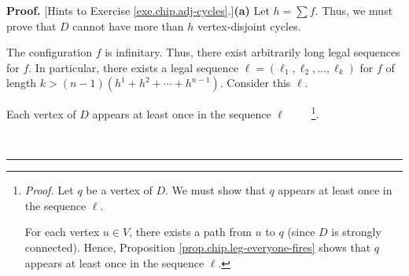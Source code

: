 \documentclass[numbers=enddot,12pt,final,onecolumn,notitlepage]{scrartcl}%
\theoremstyle{definition}
\newenvironment{proof}[1][Proof]{\noindent\textbf{#1.} }{\ \rule{0.5em}{0.5em}}
\let\sumnonlimits\sum
\renewcommand{\sum}{\sumnonlimits\limits}
\begin{document}
\begin{proof}
[Hints to Exercise \ref{exe.chip.adj-cycles}.]\textbf{(a)}
Let $h=\sum f$. Thus, we must prove that $D$ cannot have more than $h$
vertex-disjoint cycles.

The configuration
$f$ is infinitary. Thus, there exist arbitrarily long legal sequences for $f$.
In particular, there exists a legal sequence $\ell=\left(  \ell_{1},\ell
_{2},\ldots,\ell_{k}\right)  $ for $f$ of length $k>\left(  n-1\right)
\left( h^1 + h^2 + \cdots + h^{n-1} \right)  $. Consider this $\ell$.

Each vertex of $D$ appears at least once in the sequence $\ell$%
\ \ \ \ \footnote{\textit{Proof.} Let $q$ be a vertex of $D$. We must show
that $q$ appears at least once in the sequence $\ell$.
\par
For each vertex $u\in V$, there exists a path from $u$ to $q$ (since $D$ is
strongly connected). Hence, Proposition \ref{prop.chip.leg-everyone-fires}
shows that $q$ appears at least once in the sequence $\ell$.}.


\end{proof}
\end{document}
